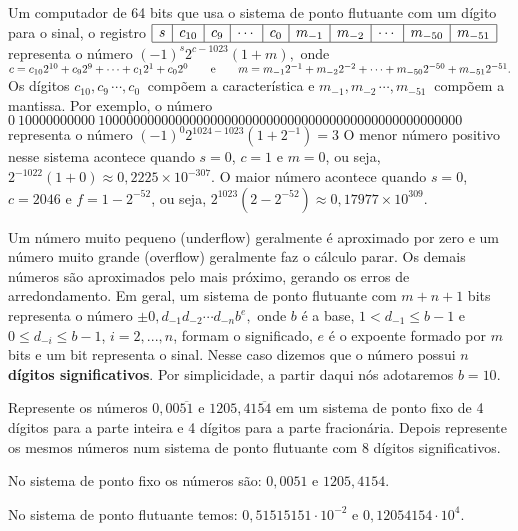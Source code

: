 \begin{ex} Um computador de 64 bits que usa o sistema de ponto flutuante com um dígito para o sinal, o registro
$
\begin{array}{|c|c|c|c|c|c|c|c|c|c|}
\hline
s&c_{10}&c_{9}&\cdots&c_{0}&m_{-1}&m_{-2}&\cdots &m_{-50}&m_{-51}\\
\hline
\end{array}
$
representa o número
$
(-1)^{s}2^{c-1023}(1+m),
$
onde
$
c=c_{10}2^{10}+c_92^9+\cdots+c_12^1+c_02^0\qquad\hbox{e}\qquad m=m_{-1}2^{-1}+m_{-2}2^{-2}+\cdots+m_{-50}2^{-50}+m_{-51}2^{-51}.
$
Os dígitos $c_{10}, c_9\, \cdots, c_0\ $ compõem a característica e $m_{-1}, m_{-2}\, \cdots, m_{-51}\ $ compõem a mantissa. Por exemplo, o número
$
0\ 1 0 0 0 0 0 0 0 0 0 0 \ 1 0 0 0 0 0 0 0 0 0 0 0 0 0 0 0 0 0 0 0 0 0 0 0 0 0 0 0 0 0 0 0 0 0 0 0 0 0 0 0 0 0 0 0 0 0 0 0 0 0 0 0
$
representa o número
$
(-1)^0 2^{1024-1023}(1+2^{-1})=3
$
O menor número positivo nesse sistema acontece quando $s=0$, $c=1$ e $m=0$, ou seja,
$
2^{-1022}(1+0)\approx 0,2225\times 10^{-307}.
$
O maior número acontece quando $s=0$, $c=2046$ e $f=1-2^{-52}$, ou seja,
$
2^{1023}(2-2^{-52})\approx 0,17977\times 10^{309}.
$
\end{ex}
Um número muito pequeno (underflow) geralmente é aproximado por zero e um número muito grande (overflow) geralmente faz o cálculo parar. Os demais números são aproximados pelo mais próximo, gerando os erros de arredondamento. Em geral, um sistema de ponto flutuante com $m+n+1$ bits representa o número
$
\pm 0,d_{-1}d_{-2}\cdots d_{-n} b^e,
$
onde $b$ é a base, $1<d_{-1}\leq b-1$ e $0\leq d_{-i}\leq b-1$, $i=2,...,n$, formam o significado, $e$ é o expoente formado por $m$ bits e um bit representa o sinal. Nesse caso dizemos que o número possui $n$ {\bf dígitos significativos}. Por simplicidade, a partir daqui nós adotaremos $b=10$.
\begin{ex}Represente os números $0,00\overline{51}$ e $1205,41\overline{54}$ em um sistema de ponto fixo de 4 dígitos para a parte inteira e 4 dígitos para a parte fracionária. Depois represente os mesmos números num sistema de ponto flutuante com 8 dígitos significativos.

No sistema de ponto fixo os números são: $0,0051$ e $1205,4154$.

No sistema de ponto flutuante temos: $0,51515151\cdot 10^{-2}$ e $0,12054154 \cdot 10^{4}$.
\end{ex}


